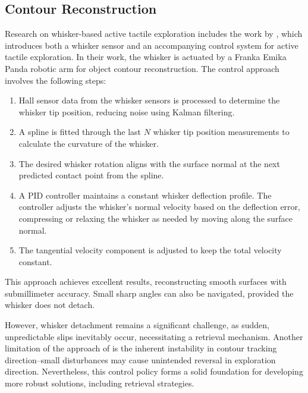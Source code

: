 \subsection{Contour Reconstruction}
Research on whisker-based active tactile exploration includes the work by \textcite{dang2025whisker}, which introduces both a whisker sensor and an accompanying control system for active tactile exploration.
In their work, the whisker is actuated by a Franka Emika Panda robotic arm for object contour reconstruction.
The control approach involves the following steps:
\begin{enumerate}
    \item Hall sensor data from the whisker sensors is processed to determine the whisker tip position, reducing noise using Kalman filtering.
    \item A spline is fitted through the last $N$ whisker tip position measurements to calculate the curvature of the whisker.
    \item The desired whisker rotation aligns with the surface normal at the next predicted contact point from the spline.
    \item A PID controller maintains a constant whisker deflection profile.
    The controller adjusts the whisker's normal velocity based on the deflection error, compressing or relaxing the whisker as needed by moving along the surface normal.
    \item The tangential velocity component is adjusted to keep the total velocity constant.
\end{enumerate}

This approach achieves excellent results, reconstructing smooth surfaces with submillimeter accuracy.
Small sharp angles can also be navigated, provided the whisker does not detach.

However, whisker detachment remains a significant challenge, as sudden, unpredictable slips inevitably occur, necessitating a retrieval mechanism.
Another limitation of the approach of \citeauthor{dang2025whisker} is the inherent instability in contour tracking direction--small disturbances may cause unintended reversal in exploration direction.
Nevertheless, this control policy forms a solid foundation for developing more robust solutions, including retrieval strategies.

